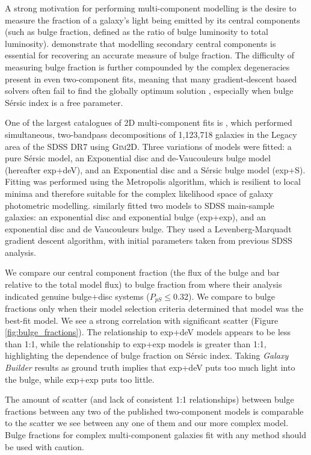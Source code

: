 \documentclass[trackchanges]{aastex63}
\begin{document}
A strong motivation for performing multi-component modelling is the desire to measure the fraction of a galaxy's light being emitted by its central components (such as bulge fraction, defined as the ratio of bulge luminosity to total luminosity). \citet{Gao2017:1709.00746v1} demonstrate that modelling secondary central components is essential for recovering an accurate measure of bulge fraction. The difficulty of measuring bulge fraction is further compounded by the complex degeneracies present in even two-component fits, meaning that many gradient-descent based solvers often fail to find the globally optimum solution \citep{profit-paper}, especially when bulge S\'ersic index is a free parameter.

One of the largest catalogues of 2D multi-component fits is \citet{2011ApJS..196...11S}, which performed simultaneous, two-bandpass decompositions of 1,123,718 galaxies in the Legacy area of the SDSS DR7 using \textsc{Gim2D}. Three variations of models were fitted: a pure S\'ersic model, an Exponential disc and de-Vaucouleurs bulge model (hereafter exp+deV), and an Exponential disc and a S\'ersic bulge model (exp+S). Fitting was performed using the Metropolis algorithm, which is resilient to local minima and therefore suitable for the complex likelihood space of galaxy photometric modelling. \citet{2012MNRAS.421.2277L} similarly fitted two models to SDSS main-sample galaxies: an exponential disc and exponential bulge (exp+exp), and an exponential disc and de Vaucouleurs bulge. They used a Levenberg-Marquadt gradient descent algorithm, with initial parameters taken from previous SDSS analysis.

We compare our central component fraction (the flux of the bulge and bar relative to the total model flux) to bulge fraction from \citet{2011ApJS..196...11S} where their analysis indicated genuine bulge+disc systems ($P_{pS} \le 0.32$). We compare to \citet{2012MNRAS.421.2277L} bulge fractions only when their model selection criteria determined that model was the best-fit model. We see a strong correlation with significant scatter (Figure \ref{fig:bulge_fractions}). The relationship to exp+deV models appears to be less than 1:1, while the relationship to exp+exp models is greater than 1:1, highlighting the dependence of bulge fraction on S\'ersic index. Taking \textit{Galaxy Builder} results as ground truth implies that exp+deV puts too much light into the bulge, while exp+exp puts too little.

The amount of scatter (and lack of consistent 1:1 relationships) between bulge fractions between any two of the published two-component models is comparable to the scatter we see between any one of them and our more complex model. Bulge fractions for complex multi-component galaxies fit with any method should be used with caution.
\end{document}
